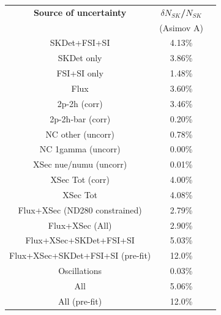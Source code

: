 

\begin{table}[htb]
\centering
\begin{tabular}{| c | c | c |}
\hline
  {\bf Source of uncertainty}    & \multicolumn{1}{c|}{{\bf ${\delta}N_{SK}$/$N_{SK}$}}\\
                                 & \multicolumn{1}{c|}{(Asimov A)}\\

\hline
\hline
SKDet+FSI+SI                   & 4.13\%                        \\
SKDet only                   & 3.86\%                        \\
FSI+SI only                   & 1.48\%                        \\
\hline
\hline
  Flux                           & 3.60\%                        \\
\hline
\hline
  2p-2h (corr)                     & 3.46\%                        \\
  2p-2h-bar (corr)                  & 0.20\%                        \\
  NC other (uncorr)              & 0.78\%                        \\
  NC 1gamma (uncorr)             & 0.00\%                        \\
  XSec nue/numu (uncorr)                 & 0.01\%                        \\
\hline
  XSec Tot (corr)                  & 4.00\%                        \\
  XSec Tot                       & 4.08\%                        \\
\hline
\hline
  Flux+XSec (ND280 constrained)                      & 2.79\%                        \\
  Flux+XSec  (All)                    & 2.90\%                        \\
\hline
  Flux+XSec+SKDet+FSI+SI         & 5.03\%                        \\
  Flux+XSec+SKDet+FSI+SI (pre-fit)         & 12.0\%                        \\
\hline
\hline
  Oscillations                   & 0.03\%                        \\
\hline
\hline
  All                            & 5.06\%                        \\
  All (pre-fit) 		& 12.0\%				\\
\hline


\end{tabular}
\end{table}
